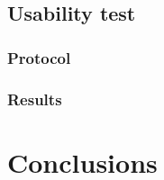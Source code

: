 \documentclass[binding=0.6cm,LaM]{sapthesis}
\begin{document}
\section{Usability test}

\subsection{Protocol}

\subsection{Results}

\chapter{Conclusions}

\backmatter
\cleardoublepage
{} %


\end{document}

